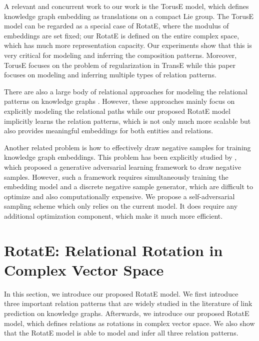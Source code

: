 \documentclass{article} \usepackage{iclr2019_conference,times}
\def\method{RotatE}
\begin{document}
A relevant and concurrent work to our work is the TorusE \citep{ebisu2018toruse} model, which defines knowledge graph embedding as translations on a compact Lie group. The TorusE model can be regarded as a special case of RotatE, where the modulus of embeddings are set fixed; our RotatE is defined on the entire complex space, which has much more representation capacity. Our experiments show that this is very critical for modeling and inferring the composition patterns. Moreover, TorusE focuses on the problem of regularization in TransE while this paper focuses on modeling and inferring multiple types of relation patterns.


There are also a large body of relational approaches for modeling the relational patterns on knowledge graphs \citep{lao2011random,neelakantan2015compositional,das2016chains,rocktaschel2017end,yang2017differentiable}. However, these approaches mainly focus on explicitly modeling the relational paths while our proposed RotatE model implicitly learns the relation patterns, which is not only much more scalable but also provides meaningful embeddings for both entities and relations. 



Another related problem is how to effectively draw negative samples for training knowledge graph embeddings. This problem has been explicitly studied by \cite{cai2017kbgan}, which proposed a generative adversarial learning framework to draw negative samples. However, such a framework requires simultaneously training the embedding model and a discrete negative sample generator, which are difficult to optimize and also computationally expensive. We propose a self-adversarial sampling scheme which only relies on the current model. It does require any additional optimization component, which make it much more efficient.

\section{\method{}: Relational Rotation in Complex Vector Space}
In this section, we introduce our proposed \method{} model. We first introduce three important relation patterns that are widely studied in the literature of link prediction on knowledge graphs. Afterwards, we introduce our proposed \method{} model, which defines relations as rotations in complex vector space. We also show that the \method{} model is able to model and infer all three relation patterns. 
\end{document}
